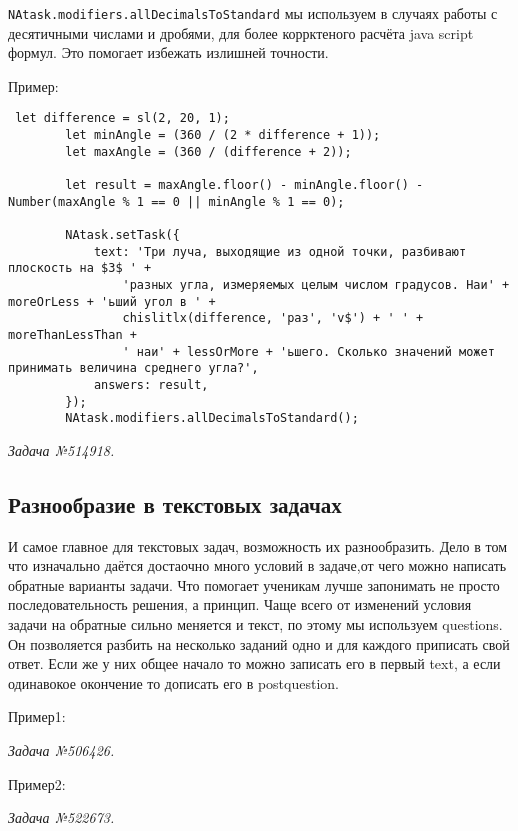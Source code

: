 \texttt{NAtask.modifiers.allDecimalsToStandard} мы используем в случаях работы с десятичными числами и дробями, для более коррктеного расчёта java script формул.
 Это помогает избежать излишней точности.

Пример:
\begin{lstlisting}
 let difference = sl(2, 20, 1);
        let minAngle = (360 / (2 * difference + 1));
        let maxAngle = (360 / (difference + 2));

        let result = maxAngle.floor() - minAngle.floor() - Number(maxAngle % 1 == 0 || minAngle % 1 == 0);

        NAtask.setTask({
            text: 'Три луча, выходящие из одной точки, разбивают плоскость на $3$ ' +
                'разных угла, измеряемых целым числом градусов. Наи' + moreOrLess + 'ьший угол в ' +
                chislitlx(difference, 'раз', 'v$') + ' ' + moreThanLessThan +
                ' наи' + lessOrMore + 'ьшего. Сколько значений может принимать величина среднего угла?',
            answers: result,
        });
        NAtask.modifiers.allDecimalsToStandard();
\end{lstlisting}       
\textsl{Задача №514918.}

\subsection{Разнообразие в текстовых задачах}
И самое главное для текстовых задач, возможность их разнообразить. Дело в том что изначально даётся достаочно много условий в задаче,от чего можно написать обратные варианты задачи. Что помогает ученикам лучше запонимать не просто последовательность решения, а принцип.
Чаще всего от изменений условия задачи на обратные сильно меняется и текст, по этому мы используем questions. Он позволяется разбить на несколько заданий одно и для каждого приписать свой ответ. Если же у них общее начало то можно записать его в первый text, а если одинавокое окончение то 
дописать его в postquestion.

Пример1: 
 
\textsl{Задача №506426.}

Пример2:
 
\textsl{Задача №522673.}